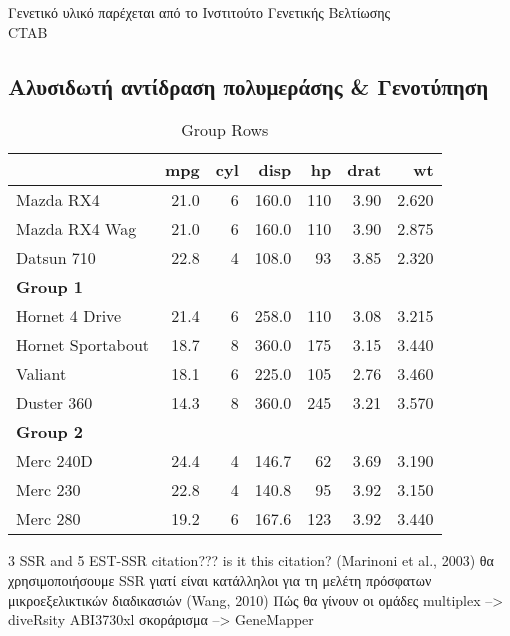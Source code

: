 \documentclass[12pt,a4paper,]{report}
\begin{document}
Γενετικό υλικό παρέχεται από το Ινστιτούτο Γενετικής Βελτίωσης\\
CTAB

\hypertarget{---}{%
\subsection{Αλυσιδωτή αντίδραση πολυμεράσης \& Γενοτύπηση}\label{---}}

\begin{table}

\caption{\label{tab:unnamed-chunk-1}Group Rows}
\centering
\begin{tabular}[t]{l|r|r|r|r|r|r}
\hline
  & mpg & cyl & disp & hp & drat & wt\\
\hline
Mazda RX4 & 21.0 & 6 & 160.0 & 110 & 3.90 & 2.620\\
\hline
Mazda RX4 Wag & 21.0 & 6 & 160.0 & 110 & 3.90 & 2.875\\
\hline
Datsun 710 & 22.8 & 4 & 108.0 & 93 & 3.85 & 2.320\\
\hline
\multicolumn{7}{l}{\textbf{Group 1}}\\
\hline
\hspace{1em}Hornet 4 Drive & 21.4 & 6 & 258.0 & 110 & 3.08 & 3.215\\
\hline
\hspace{1em}Hornet Sportabout & 18.7 & 8 & 360.0 & 175 & 3.15 & 3.440\\
\hline
\hspace{1em}Valiant & 18.1 & 6 & 225.0 & 105 & 2.76 & 3.460\\
\hline
\hspace{1em}Duster 360 & 14.3 & 8 & 360.0 & 245 & 3.21 & 3.570\\
\hline
\multicolumn{7}{l}{\textbf{Group 2}}\\
\hline
\hspace{1em}Merc 240D & 24.4 & 4 & 146.7 & 62 & 3.69 & 3.190\\
\hline
\hspace{1em}Merc 230 & 22.8 & 4 & 140.8 & 95 & 3.92 & 3.150\\
\hline
\hspace{1em}Merc 280 & 19.2 & 6 & 167.6 & 123 & 3.92 & 3.440\\
\hline
\end{tabular}
\end{table}

3 SSR and 5 EST-SSR citation??? is it this citation? (Marinoni et al.,
2003) θα χρησιμοποιήσουμε SSR γιατί είναι κατάλληλοι για τη μελέτη
πρόσφατων μικροεξελικτικών διαδικασιών (Wang, 2010) Πώς θα γίνουν οι
ομάδες multiplex --\textgreater{} diveRsity ABI3730xl σκοράρισμα
--\textgreater{} GeneMapper
\end{document}
